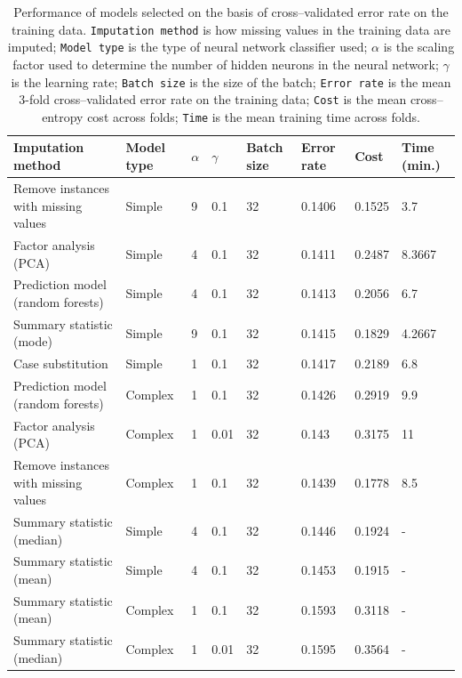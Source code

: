 \documentclass[10pt,twocolumn,letterpaper]{article}
\begin{document}
\begin{table}[htbp]
\begin{center}
\begin{tabular}{llllllll}
\textbf{Imputation method} & \textbf{Model type} & \textbf{$\alpha$} & \textbf{$\gamma$} & \textbf{Batch size} & \textbf{Error rate} & \textbf{Cost} & \textbf{Time (min.)} \\
\hline
      \rowcolor{Gray}
Remove instances with missing values & Simple & 9 & 0.1 & 32 & 0.1406 & 0.1525 & 3.7 \\
Factor analysis (PCA)  & Simple & 4 & 0.1 & 32 & 0.1411 & 0.2487 & 8.3667 \\
      \rowcolor{Gray}
Prediction model (random forests) & Simple & 4 & 0.1 & 32 & 0.1413 & 0.2056 & 6.7 \\
      \rowcolor{Gray}
Summary statistic (mode) & Simple & 9 & 0.1 & 32 & 0.1415 & 0.1829 & 4.2667 \\
Case substitution & Simple & 1 & 0.1 & 32 & 0.1417 & 0.2189 & 6.8 \\
Prediction model  (random forests) & Complex & 1 & 0.1 & 32 & 0.1426 & 0.2919 & 9.9 \\
Factor analysis (PCA) & Complex & 1 & 0.01 & 32 & 0.143 & 0.3175 & 11 \\
Remove instances with missing values & Complex & 1 & 0.1 & 32 & 0.1439 & 0.1778 & 8.5 \\
Summary statistic (median) & Simple & 4 & 0.1 & 32 & 0.1446 & 0.1924 & - \\
Summary statistic (mean) & Simple & 4 & 0.1 & 32 & 0.1453 & 0.1915 & - \\
Summary statistic (mean) & Complex & 1 & 0.1 & 32 & 0.1593 & 0.3118 & - \\
Summary statistic  (median) & Complex & 1 & 0.01 & 32 & 0.1595 & 0.3564 & - \\
\hline
\end{tabular}
\end{center}
\caption{Performance of models selected on the basis of cross--validated error rate on the training data. \texttt{Imputation method} is how missing values in the training data are imputed; \texttt{Model type} is the type of neural network classifier used; \texttt{$\alpha$} is the scaling factor used to determine the number of hidden neurons in the neural network; \texttt{$\gamma$} is the learning rate; \texttt{Batch size} is the size of the batch; \texttt{Error rate} is the mean 3-fold cross--validated error rate on the training data;  \texttt{Cost} is the mean cross--entropy cost across folds; \texttt{Time} is the mean training time across folds. }
\label{tab:err-rates}
\end{table}
\end{document}
